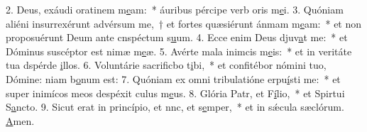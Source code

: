 2. Deus, exáudi oratinem m\uline{e}am:~* áuribus pércipe verb oris m\uline{e}i.
3. Quóniam aliéni insurrexérunt advérsum me,~† et fortes quæsiérunt ánmam m\uline{e}am:~* et non proposuérunt Deum ante cnspéctum s\uline{u}um.
4. Ecce enim Deus djuv\uline{a}t me:~* et Dóminus suscéptor est nimæ m\uline{e}æ.
5. Avérte mala inimcis m\uline{e}is:~* et in veritáte tua dspérde \uline{i}llos.
6. Voluntárie sacrificbo t\uline{i}bi,~* et confitébor nómini tuo, Dómine: niam b\uline{o}num est:
7. Quóniam ex omni tribulatióne erpu\uline{í}sti me:~* et super inimícos meos despéxit culus m\uline{e}us.
8. Glória Patr, et F\uline{í}lio,~* et Spirtui S\uline{a}ncto.
9. Sicut erat in princípio, et nnc, et s\uline{e}mper,~* et in sǽcula sæclórum. \uline{A}men.

